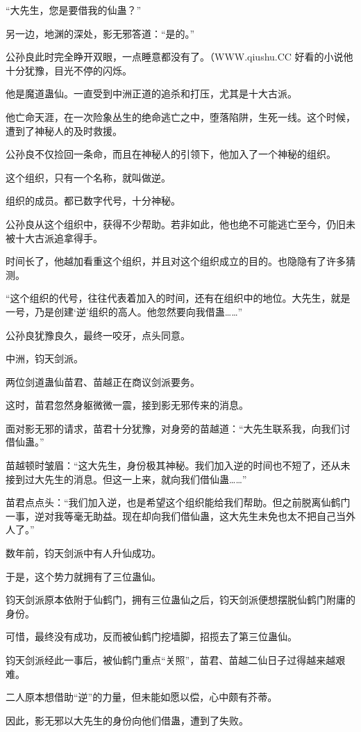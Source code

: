 \begin{this_body}
“大先生，您是要借我的仙蛊？”

另一边，地渊的深处，影无邪答道：“是的。”

公孙良此时完全睁开双眼，一点睡意都没有了。（WWW.qiushu.CC 好看的小说他十分犹豫，目光不停的闪烁。

他是魔道蛊仙。一直受到中洲正道的追杀和打压，尤其是十大古派。

他亡命天涯，在一次险象丛生的绝命逃亡之中，堕落陷阱，生死一线。这个时候，遭到了神秘人的及时救援。

公孙良不仅捡回一条命，而且在神秘人的引领下，他加入了一个神秘的组织。

这个组织，只有一个名称，就叫做逆。

组织的成员。都已数字代号，十分神秘。

公孙良从这个组织中，获得不少帮助。若非如此，他也绝不可能逃亡至今，仍旧未被十大古派追拿得手。

时间长了，他越加看重这个组织，并且对这个组织成立的目的。也隐隐有了许多猜测。

“这个组织的代号，往往代表着加入的时间，还有在组织中的地位。大先生，就是一号，乃是创建‘逆’组织的高人。他忽然要向我借蛊……”

公孙良犹豫良久，最终一咬牙，点头同意。

中洲，钧天剑派。

两位剑道蛊仙苗君、苗越正在商议剑派要务。

这时，苗君忽然身躯微微一震，接到影无邪传来的消息。

面对影无邪的请求，苗君十分犹豫，对身旁的苗越道：“大先生联系我，向我们讨借仙蛊。”

苗越顿时皱眉：“这大先生，身份极其神秘。我们加入逆的时间也不短了，还从未接到过大先生的消息。但这一上来，就向我们借仙蛊……”

苗君点点头：“我们加入逆，也是希望这个组织能给我们帮助。但之前脱离仙鹤门一事，逆对我等毫无助益。现在却向我们借仙蛊，这大先生未免也太不把自己当外人了。”

数年前，钧天剑派中有人升仙成功。

于是，这个势力就拥有了三位蛊仙。

钧天剑派原本依附于仙鹤门，拥有三位蛊仙之后，钧天剑派便想摆脱仙鹤门附庸的身份。

可惜，最终没有成功，反而被仙鹤门挖墙脚，招揽去了第三位蛊仙。

钧天剑派经此一事后，被仙鹤门重点“关照”，苗君、苗越二仙日子过得越来越艰难。

二人原本想借助“逆”的力量，但未能如愿以偿，心中颇有芥蒂。

因此，影无邪以大先生的身份向他们借蛊，遭到了失败。


\end{this_body}
